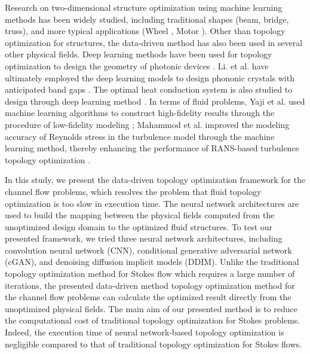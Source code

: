 \documentclass{article}
\begin{document}
Research on two-dimensional structure optimization using machine learning methods has been widely studied, including traditional shapes (beam, bridge, truss)\cite{3-TopoCNN-wang2022deep, 1-TopoGAN-nie2021topologygan},  and more typical applications (Wheel \cite{6-21-oh2018design}, Motor \cite{6-20-sasaki2019topology}). Other than topology optimization for structures, the data-driven method has also been used in several other physical fields. Deep learning methods have been used for topology optimization to design the geometry of photonic devices \cite{6-13-liu2018training, 6-11-mao2023multi, 6-12-kojima2021inverse}. Li. et al. have ultimately employed the deep learning models to design phononic crystals with anticipated band gaps \cite{6-14-li2020designing}. The optimal heat conduction system is also studied to design through deep learning method \cite{6-15-deng2022self, 6-16-keshavarzzadeh2021image, 6-17-zhang2021tonr}. In terms of fluid problems, Yaji et al. used machine learning algorithms to construct high-fidelity results through the procedure of low-fidelity modeling \cite{fluid_based1}; Mahammod et al. improved the modeling accuracy of Reynolds stress in the turbulence model through the machine learning method, thereby enhancing the performance of RANS-based turbulence topology optimization \cite{fluid_based2}. 

In this study, we present the data-driven topology optimization framework for the channel flow problems, which resolves the problem that fluid topology optimization is too slow in execution time. The neural network architectures are used to build the mapping between the physical fields computed from the unoptimized design domain to the optimized fluid structures. To test our presented framework, we tried three neural network architectures, including convolution neural network (CNN), conditional generative adversarial network (cGAN), and denoising diffusion implicit models (DDIM). Unlike the traditional topology optimization method for Stokes flow which requires a large number of iterations, the presented data-driven method topology optimization method for the channel flow problems can calculate the optimized result directly from the unoptimized physical fields. The main aim of our presented method is to reduce the computational cost of traditional topology optimization for Stokes problems. Indeed, the execution time of neural network-based topology optimization is negligible compared to that of traditional topology optimization for Stokes flows.
\end{document}
